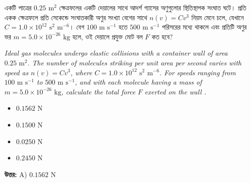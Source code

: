 \documentclass[12pt, a4paper]{article}
\begin{document}
\newpage
\begin{tcolorbox}[questionbox={প্রশ্ন (Question) 1}]
    \noindent
    একটি পাত্রের $0.25\text{ m}^2$ ক্ষেত্রফলের একটি দেয়ালের সাথে আদর্শ গ্যাসের অণুগুলোর স্থিতিস্থাপক সংঘাত ঘটে। প্রতি একক ক্ষেত্রফলে প্রতি সেকেন্ডে সংঘাতকারী অণুর সংখ্যা বেগের সাথে $n(v) = C v^3$ নিয়ম মেনে চলে, যেখানে $C = 1.0 \times 10^{12}\text{ s}^2\text{ m}^{-6}$। বেগ $100\text{ m s}^{-1}$ হতে $500\text{ m s}^{-1}$ পরিসরের মধ্যে থাকলে এবং প্রতিটি অণুর ভর $m = 5.0 \times 10^{-26}\text{ kg}$ হলে, ওই দেয়ালে প্রযুক্ত মোট বল $F$ কত হবে?
    
    \vspace{0.8em}
    \begin{english}
    \noindent\textit{\color{darkgray}
    Ideal gas molecules undergo elastic collisions with a container wall of area $0.25\text{ m}^2$. The number of molecules striking per unit area per second varies with speed as $n(v) = C v^3$, where $C = 1.0 \times 10^{12}\text{ s}^2\text{ m}^{-6}$. For speeds ranging from $100\text{ m s}^{-1}$ to $500\text{ m s}^{-1}$, and with each molecule having a mass of $m = 5.0 \times 10^{-26}\text{ kg}$, calculate the total force $F$ exerted on the wall .
    }
    \end{english}
\end{tcolorbox}

\begin{itemize}[label={}, leftmargin=1cm, itemsep=0.5em]
    \item[\textbf{A)}] $0.1562\text{ N}$
    \item[\textbf{B)}] $0.1500\text{ N}$
    \item[\textbf{C)}] $0.0250\text{ N}$
    \item[\textbf{D)}] $0.2450\text{ N}$
\end{itemize}

\vspace{0.5em}
\begin{tcolorbox}[answerbox]
    \textbf{\color{success} উত্তর:} A) $0.1562\text{ N}$
\end{tcolorbox}
\vspace{1em}
\end{document}
